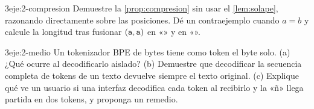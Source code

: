 \begin{ejercicio}{3}{eje:2-compresion}
Demuestre la \cref{prop:compresion} sin usar el \cref{lem:solape}, razonando directamente sobre las posiciones. Dé un contraejemplo cuando $a=b$ y calcule la longitud tras fusionar $(\texttt{a},\texttt{a})$ en «» y en «».
\end{ejercicio}

\begin{ejercicio}{3}{eje:2-medio}
Un tokenizador BPE de bytes tiene como token el byte  solo. (a) ¿Qué ocurre al decodificarlo aislado? (b) Demuestre que decodificar la secuencia completa de tokens de un texto devuelve siempre el texto original. (c) Explique qué ve un usuario si una interfaz decodifica cada token al recibirlo y la «ñ» llega partida en dos tokens, y proponga un remedio.
\end{ejercicio}
